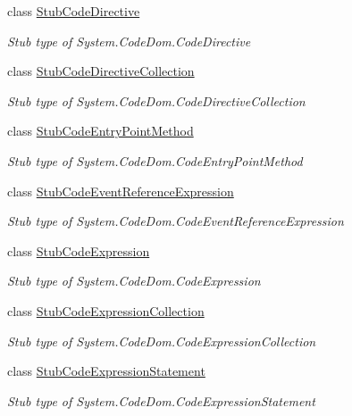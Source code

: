 \begin{DoxyCompactItemize}
class \hyperlink{class_system_1_1_code_dom_1_1_fakes_1_1_stub_code_directive}{Stub\-Code\-Directive}
\begin{DoxyCompactList}\small\item\em Stub type of System.\-Code\-Dom.\-Code\-Directive\end{DoxyCompactList}\item 
class \hyperlink{class_system_1_1_code_dom_1_1_fakes_1_1_stub_code_directive_collection}{Stub\-Code\-Directive\-Collection}
\begin{DoxyCompactList}\small\item\em Stub type of System.\-Code\-Dom.\-Code\-Directive\-Collection\end{DoxyCompactList}\item 
class \hyperlink{class_system_1_1_code_dom_1_1_fakes_1_1_stub_code_entry_point_method}{Stub\-Code\-Entry\-Point\-Method}
\begin{DoxyCompactList}\small\item\em Stub type of System.\-Code\-Dom.\-Code\-Entry\-Point\-Method\end{DoxyCompactList}\item 
class \hyperlink{class_system_1_1_code_dom_1_1_fakes_1_1_stub_code_event_reference_expression}{Stub\-Code\-Event\-Reference\-Expression}
\begin{DoxyCompactList}\small\item\em Stub type of System.\-Code\-Dom.\-Code\-Event\-Reference\-Expression\end{DoxyCompactList}\item 
class \hyperlink{class_system_1_1_code_dom_1_1_fakes_1_1_stub_code_expression}{Stub\-Code\-Expression}
\begin{DoxyCompactList}\small\item\em Stub type of System.\-Code\-Dom.\-Code\-Expression\end{DoxyCompactList}\item 
class \hyperlink{class_system_1_1_code_dom_1_1_fakes_1_1_stub_code_expression_collection}{Stub\-Code\-Expression\-Collection}
\begin{DoxyCompactList}\small\item\em Stub type of System.\-Code\-Dom.\-Code\-Expression\-Collection\end{DoxyCompactList}\item 
class \hyperlink{class_system_1_1_code_dom_1_1_fakes_1_1_stub_code_expression_statement}{Stub\-Code\-Expression\-Statement}
\begin{DoxyCompactList}\small\item\em Stub type of System.\-Code\-Dom.\-Code\-Expression\-Statement\end{DoxyCompactList}\item 

\end{DoxyCompactItemize}
